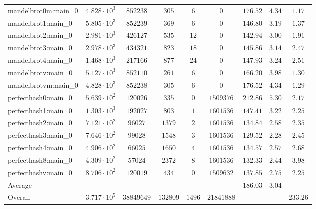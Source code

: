 \begin{tabular}{|l|c|c|c|c|c|c|c|c|}
mandelbrot0m:main\_0           & $ 4.828 \cdot 10^{3} $ & $ 852238   $ & $ 305    $ & $ 6    $ & $ 0        $ & $ 176.52      $ & $ 4.34    $ & $ 1.17    $ \\
mandelbrot1:main\_0            & $ 5.805 \cdot 10^{3} $ & $ 852239   $ & $ 369    $ & $ 6    $ & $ 0        $ & $ 146.80      $ & $ 3.19    $ & $ 1.37    $ \\
mandelbrot2:main\_0            & $ 2.981 \cdot 10^{3} $ & $ 426127   $ & $ 535    $ & $ 12   $ & $ 0        $ & $ 142.94      $ & $ 3.00    $ & $ 1.91    $ \\
mandelbrot3:main\_0            & $ 2.978 \cdot 10^{3} $ & $ 434321   $ & $ 823    $ & $ 18   $ & $ 0        $ & $ 145.86      $ & $ 3.14    $ & $ 2.47    $ \\
mandelbrot4:main\_0            & $ 1.468 \cdot 10^{3} $ & $ 217166   $ & $ 877    $ & $ 24   $ & $ 0        $ & $ 147.93      $ & $ 3.24    $ & $ 2.51    $ \\
mandelbrotv:main\_0            & $ 5.127 \cdot 10^{3} $ & $ 852110   $ & $ 261    $ & $ 6    $ & $ 0        $ & $ 166.20      $ & $ 3.98    $ & $ 1.30    $ \\
mandelbrotvm:main\_0           & $ 4.828 \cdot 10^{3} $ & $ 852238   $ & $ 305    $ & $ 6    $ & $ 0        $ & $ 176.52      $ & $ 4.34    $ & $ 1.29    $ \\
perfecthash0:main\_0           & $ 5.639 \cdot 10^{2} $ & $ 120026   $ & $ 335    $ & $ 0    $ & $ 1509376  $ & $ 212.86      $ & $ 5.30    $ & $ 2.17    $ \\
perfecthash1:main\_0           & $ 1.303 \cdot 10^{3} $ & $ 192027   $ & $ 803    $ & $ 1    $ & $ 1601536  $ & $ 147.41      $ & $ 3.22    $ & $ 2.25    $ \\
perfecthash2:main\_0           & $ 7.121 \cdot 10^{2} $ & $ 96027    $ & $ 1379   $ & $ 2    $ & $ 1601536  $ & $ 134.84      $ & $ 2.58    $ & $ 2.35    $ \\
perfecthash3:main\_0           & $ 7.646 \cdot 10^{2} $ & $ 99028    $ & $ 1548   $ & $ 3    $ & $ 1601536  $ & $ 129.52      $ & $ 2.28    $ & $ 2.45    $ \\
perfecthash4:main\_0           & $ 4.906 \cdot 10^{2} $ & $ 66025    $ & $ 1650   $ & $ 4    $ & $ 1601536  $ & $ 134.57      $ & $ 2.57    $ & $ 2.68    $ \\
perfecthash8:main\_0           & $ 4.309 \cdot 10^{2} $ & $ 57024    $ & $ 2372   $ & $ 8    $ & $ 1601536  $ & $ 132.33      $ & $ 2.44    $ & $ 3.98    $ \\
perfecthashv:main\_0           & $ 8.706 \cdot 10^{2} $ & $ 120019   $ & $ 434    $ & $ 0    $ & $ 1509632  $ & $ 137.85      $ & $ 2.75    $ & $ 2.25    $ \\
\hline
Average                        & $                    $ & $          $ & $        $ & $      $ & $          $ & $ 186.03      $ & $ 3.04    $ & $         $ \\
\hline
Overall                        & $ 3.717 \cdot 10^{5} $ & $ 38849649 $ & $ 132809 $ & $ 1496 $ & $ 21841888 $ & $             $ & $         $ & $ 233.26  $ \\
\hline
\end{tabular}
